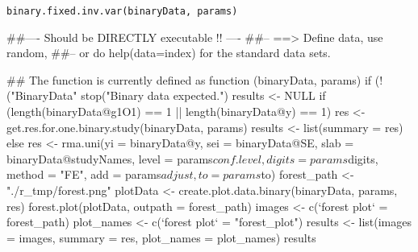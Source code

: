 \begin{Usage}
\begin{verbatim}
binary.fixed.inv.var(binaryData, params)
\end{verbatim}
\end{Usage}
\begin{Arguments}
\begin{ldescription}
\item[\code{binaryData}] 
\item[\code{params}] 
\end{ldescription}
\end{Arguments}
\begin{Examples}
\begin{ExampleCode}
##---- Should be DIRECTLY executable !! ----
##-- ==>  Define data, use random,
##--    or do  help(data=index)  for the standard data sets.

## The function is currently defined as
function (binaryData, params) 
{
    if (!("BinaryData" %
        stop("Binary data expected.")
    results <- NULL
    if (length(binaryData@g1O1) == 1 || length(binaryData@y) == 
        1) {
        res <- get.res.for.one.binary.study(binaryData, params)
        results <- list(summary = res)
    }
    else {
        res <- rma.uni(yi = binaryData@y, sei = binaryData@SE, 
            slab = binaryData@studyNames, level = params$conf.level, 
            digits = params$digits, method = "FE", add = params$adjust, 
            to = params$to)
        forest_path <- "./r_tmp/forest.png"
        plotData <- create.plot.data.binary(binaryData, params, 
            res)
        forest.plot(plotData, outpath = forest_path)
        images <- c(`forest plot` = forest_path)
        plot_names <- c(`forest plot` = "forest_plot")
        results <- list(images = images, summary = res, plot_names = plot_names)
    }
    results
  }
\end{ExampleCode}
\end{Examples}

